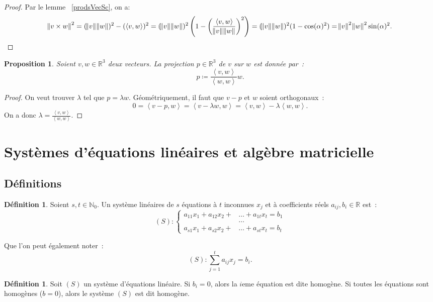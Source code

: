 \documentclass{article}
\newcommand{\N}{\mathbb N}
\newcommand{\R}{\mathbb R}
\newcommand{\scpr}[2]{\left\langle #1, #2\right\rangle}
\newtheorem{prp}[thm]{Proposition}
\theoremstyle{definition}
\newtheorem{déf}[thm]{Définition}
\theoremstyle{remark}
\begin{document}
		\begin{proof} Par le lemme ~\ref{prodsVecSc}, on a:
		\[\norm{v \times w}^2 = (\norm v\norm w)^2 - (\scpr vw)^2 = (\norm v\norm w)^2\left(1 - \left(\frac {\scpr vw}{\norm v\norm w}\right)^2\right)
		= (\norm v\norm w)^2(1-\cos(\alpha)^2) = \norm v^2\norm w^2 \sin(\alpha)^2.\] \end{proof}

		\begin{prp} Soient $v, w \in \R^3$ deux vecteurs. La projection $p \in \R^3$ de $v$ sur $w$ est donnée par~:\[p \coloneqq \frac {\scpr vw}{\scpr ww}w.\] \end{prp}

		\begin{proof} On veut trouver $\lambda$ tel que $p = \lambda w$. Géométriquement, il faut que $v-p$ et $w$ soient orthogonaux~:
		\[0 = \scpr {v-p}w = \scpr {v-\lambda w}w = \scpr vw - \lambda \scpr ww.\] On a donc $\lambda = \frac {\scpr vw}{\scpr ww}$. \end{proof}

\newpage
\section{Systèmes d'équations linéaires et algèbre matricielle}
	\subsection{Définitions}
		\begin{déf} Soient $s, t \in \N_0$. Un système linéaires de $s$ équations à $t$ inconnues $x_j$ et à coefficients réels $a_{ij}, b_i \in \R$ est~:
		\[(S) : \left\{\begin{aligned}
			a_{11}x_1 + a_{12}x_2 + &\ldots + a_{1t}x_t = b_1 \\
			&\ldots \\
			a_{s1}x_1 + a_{s2}x_2 + &\ldots + a_{st}x_t = b_t
		\end{aligned}\right.\]

		Que l'on peut également noter~:
		\[(S) : \sum_{j=1}^ta_{ij}x_j = b_i\tag*{$i \in [s]$}.\]
		\end{déf}

		\begin{déf} Soit $(S)$ un système d'équations linéaire. Si $b_i = 0$, alors la $i$eme équation est dite homogène. Si toutes les équations sont homogènes ($b = 0$),
		alors le système $(S)$ est dit homogène. \end{déf}
\end{document}
